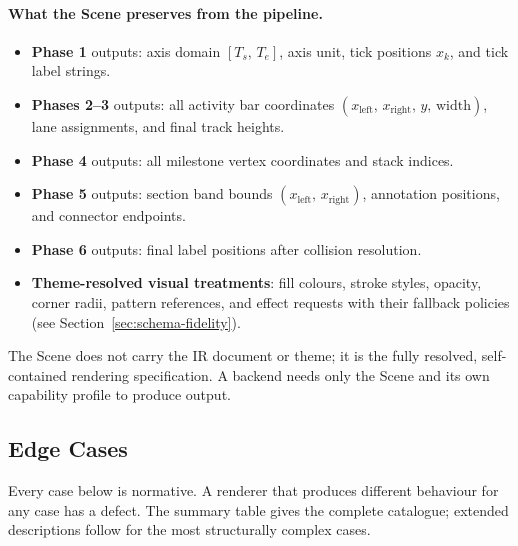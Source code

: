 \paragraph{What the Scene preserves from the pipeline.}
\begin{itemize}
  \item \textbf{Phase 1} outputs: axis domain $[T_s,\,T_e]$, axis unit, tick positions
        $x_k$, and tick label strings.
  \item \textbf{Phases 2--3} outputs: all activity bar coordinates
        $(x_{\text{left}},\,x_{\text{right}},\,y,\,\text{width})$, lane assignments,
        and final track heights.
  \item \textbf{Phase 4} outputs: all milestone vertex coordinates and stack indices.
  \item \textbf{Phase 5} outputs: section band bounds
        $(x_{\text{left}},\,x_{\text{right}})$, annotation positions, and connector
        endpoints.
  \item \textbf{Phase 6} outputs: final label positions after collision resolution.
  \item \textbf{Theme-resolved visual treatments}: fill colours, stroke styles, opacity,
        corner radii, pattern references, and effect requests with their fallback policies
        (see Section~\ref{sec:schema-fidelity}).
\end{itemize}

The Scene does not carry the IR document or theme; it is the fully resolved,
self-contained rendering specification. A backend needs only the Scene and its own
capability profile to produce output.

\subsection{Edge Cases}
\label{sec:edge-cases}

Every case below is normative. A renderer that produces different behaviour for any case
has a defect. The summary table gives the complete catalogue; extended descriptions follow
for the most structurally complex cases.

